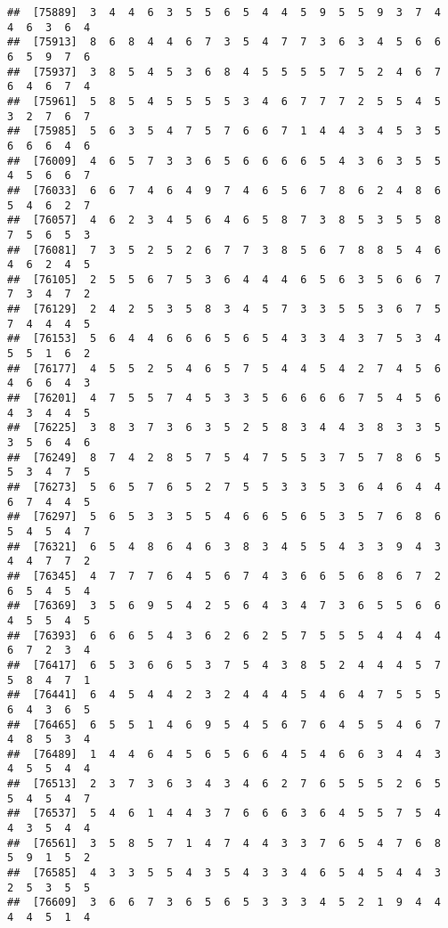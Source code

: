\documentclass[
]{book}
\begin{document}
\begin{verbatim}
##  [75889]  3  4  4  6  3  5  5  6  5  4  4  5  9  5  5  9  3  7  4  4  6  3  6  4
##  [75913]  8  6  8  4  4  6  7  3  5  4  7  7  3  6  3  4  5  6  6  6  5  9  7  6
##  [75937]  3  8  5  4  5  3  6  8  4  5  5  5  5  7  5  2  4  6  7  6  4  6  7  4
##  [75961]  5  8  5  4  5  5  5  5  3  4  6  7  7  7  2  5  5  4  5  3  2  7  6  7
##  [75985]  5  6  3  5  4  7  5  7  6  6  7  1  4  4  3  4  5  3  5  6  6  6  4  6
##  [76009]  4  6  5  7  3  3  6  5  6  6  6  6  5  4  3  6  3  5  5  4  5  6  6  7
##  [76033]  6  6  7  4  6  4  9  7  4  6  5  6  7  8  6  2  4  8  6  5  4  6  2  7
##  [76057]  4  6  2  3  4  5  6  4  6  5  8  7  3  8  5  3  5  5  8  7  5  6  5  3
##  [76081]  7  3  5  2  5  2  6  7  7  3  8  5  6  7  8  8  5  4  6  4  6  2  4  5
##  [76105]  2  5  5  6  7  5  3  6  4  4  4  6  5  6  3  5  6  6  7  7  3  4  7  2
##  [76129]  2  4  2  5  3  5  8  3  4  5  7  3  3  5  5  3  6  7  5  7  4  4  4  5
##  [76153]  5  6  4  4  6  6  6  5  6  5  4  3  3  4  3  7  5  3  4  5  5  1  6  2
##  [76177]  4  5  5  2  5  4  6  5  7  5  4  4  5  4  2  7  4  5  6  4  6  6  4  3
##  [76201]  4  7  5  5  7  4  5  3  3  5  6  6  6  6  7  5  4  5  6  4  3  4  4  5
##  [76225]  3  8  3  7  3  6  3  5  2  5  8  3  4  4  3  8  3  3  5  3  5  6  4  6
##  [76249]  8  7  4  2  8  5  7  5  4  7  5  5  3  7  5  7  8  6  5  5  3  4  7  5
##  [76273]  5  6  5  7  6  5  2  7  5  5  3  3  5  3  6  4  6  4  4  6  7  4  4  5
##  [76297]  5  6  5  3  3  5  5  4  6  6  5  6  5  3  5  7  6  8  6  5  4  5  4  7
##  [76321]  6  5  4  8  6  4  6  3  8  3  4  5  5  4  3  3  9  4  3  4  4  7  7  2
##  [76345]  4  7  7  7  6  4  5  6  7  4  3  6  6  5  6  8  6  7  2  6  5  4  5  4
##  [76369]  3  5  6  9  5  4  2  5  6  4  3  4  7  3  6  5  5  6  6  4  5  5  4  5
##  [76393]  6  6  6  5  4  3  6  2  6  2  5  7  5  5  5  4  4  4  4  6  7  2  3  4
##  [76417]  6  5  3  6  6  5  3  7  5  4  3  8  5  2  4  4  4  5  7  5  8  4  7  1
##  [76441]  6  4  5  4  4  2  3  2  4  4  4  5  4  6  4  7  5  5  5  6  4  3  6  5
##  [76465]  6  5  5  1  4  6  9  5  4  5  6  7  6  4  5  5  4  6  7  4  8  5  3  4
##  [76489]  1  4  4  6  4  5  6  5  6  6  4  5  4  6  6  3  4  4  3  4  5  5  4  4
##  [76513]  2  3  7  3  6  3  4  3  4  6  2  7  6  5  5  5  2  6  5  5  4  5  4  7
##  [76537]  5  4  6  1  4  4  3  7  6  6  6  3  6  4  5  5  7  5  4  4  3  5  4  4
##  [76561]  3  5  8  5  7  1  4  7  4  4  3  3  7  6  5  4  7  6  8  5  9  1  5  2
##  [76585]  4  3  3  5  5  4  3  5  4  3  3  4  6  5  4  5  4  4  3  2  5  3  5  5
##  [76609]  3  6  6  7  3  6  5  6  5  3  3  3  4  5  2  1  9  4  4  4  4  5  1  4

\end{verbatim}
\end{document}
